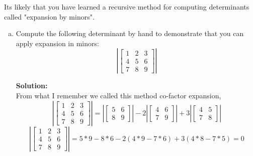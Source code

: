 \documentclass[12pt]{article}
\makeatletter
\theoremstyle{homework}
\newenvironment{exercise}[1]
{\def\@currentlabel{#1}\exercisecore}
{\endexercisecore}
\newcommand{\localhead}[1]{\par\smallskip\noindent\textbf{#1}\nobreak\\}%
\newcommand\solution{\localhead{Solution:}}
\makeatother
\begin{document}
\begin{exercise}{P6} Its likely that you have learned a recursive method for computing determinants called
  "expansion by minors".
  \begin{enumerate}[a.]
    \item Compute the following determinant by hand to demonstrate that you can apply expansion in minors:
          \begin{equation*}
            \left|\begin{bmatrix}
              1 & 2 & 3 \\
              4 & 5 & 6 \\
              7 & 8 & 9
            \end{bmatrix}\right|
          \end{equation*}
          \solution From what I remember we called this method co-factor expansion,
          \begin{equation*}
            \left|\begin{bmatrix}
              1 & 2 & 3 \\
              4 & 5 & 6 \\
              7 & 8 & 9
            \end{bmatrix}\right|
            = \left|\begin{bmatrix}
              5 & 6 \\
              8 & 9
            \end{bmatrix}\right|
            -2
            \left|\begin{bmatrix}
              4 & 6 \\
              7 & 9
            \end{bmatrix}\right|
            +3
            \left|\begin{bmatrix}
              4 & 5 \\
              7 & 8
            \end{bmatrix}\right|
          \end{equation*}
          \begin{equation*}
            \left|\begin{bmatrix}
              1 & 2 & 3 \\
              4 & 5 & 6 \\
              7 & 8 & 9
            \end{bmatrix}\right|
            = 5*9-8*6
            -2(4*9 - 7*6)
            +3(4*8 - 7*5)
            = 0
          \end{equation*}

  \end{enumerate}

\end{exercise}
\end{document}
